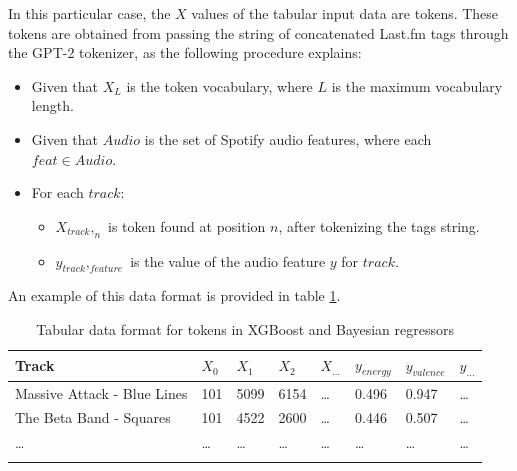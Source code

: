 \documentclass[sn-mathphys]{sn-jnl}%
\theoremstyle{thmstyleone}%
\theoremstyle{thmstyletwo}%
\theoremstyle{thmstylethree}%
\begin{document}
In this particular case, the $X$ values of the tabular input data are tokens.
These tokens are obtained from passing the string of concatenated Last.fm tags through the GPT-2 tokenizer,
as the following procedure explains:

\begin{itemize}
      \item Given that $X_L$ is the token vocabulary, where $L$ is the maximum vocabulary length.
      \item Given that $Audio$ is the set of Spotify audio features, where each $feat \in Audio$.
      \item For each $track$:
      \begin{itemize}
            \item $X_{track},_{n}$ is token found at position $n$, after tokenizing the tags string.
            \item $y_{track},_{feature}$ is the value of the audio feature $y$ for $track$.
      \end{itemize}
\end{itemize}

An example of this data format is provided in table \ref{tabular_token_format}.

\begin{table}[h]
      \begin{center}
      \begin{minipage}{\textwidth}
      \caption{Tabular data format for tokens in XGBoost and Bayesian regressors}\label{tabular_token_format}%
      \begin{tabular}{@{}llllllll@{}}
      \toprule
      Track                         & $X_{0}$ & $X_{1}$ & $X_{2}$ & $X_{\dots}$ & $y_{energy}$ & $y_{valence}$ & $y_{\dots}$ \\
      \midrule
      Massive Attack - Blue Lines   & 101     & 5099    & 6154    &  \dots      & 0.496        & 0.947         &  \dots  \\
      The Beta Band - Squares       & 101     & 4522    & 2600    &  \dots      & 0.446        & 0.507         &  \dots  \\
      \dots                         & \dots   & \dots   & \dots   &  \dots      & \dots        & \dots         &  \dots  \\
      \botrule
      \end{tabular}
      \end{minipage}
      \end{center}
\end{table}
\end{document}
